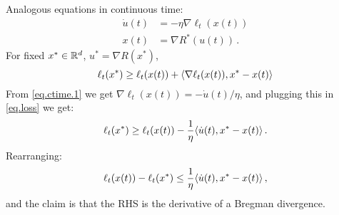 \documentclass[12pt]{report}
\theoremstyle{plain}
\theoremstyle{definition}
\theoremstyle{remark}
\begin{document}
Analogous equations in continuous time:
\begin{align*}
\dot{u}(t) &= - \eta \nabla \ell_{t}(x(t)) \label{eq.ctime.1} \tag{1ct} \\
x(t) &= \nabla R^{*}(u(t))\,. \label{eq.ctime.2} \tag{2ct}
\end{align*}
For fixed $x^{*} \in \mathbb{R}^d$, $u^{*} = \nabla R(x^{*})$,
\setcounter{equation}{2}
\begin{equation}
\ell_{t}(x^{*}) \geq \ell_{t}(x(t)) + \langle {\nabla\ell_t(x(t)), x^{*} - x(t)}\rangle \label{eq.loss}
\end{equation}
From \eqref{eq.ctime.1} we get $\nabla \ell_{t}(x(t)) = -\dot{u}(t)/\eta$, 
and plugging this in \eqref{eq.loss} we get:
$$
\ell_{t}(x^{*}) \geq \ell_{t}(x(t)) - \frac{1}{\eta} \langle {\dot{u}(t), x^{*} - x(t)}\rangle\,.
$$
Rearranging:
\begin{equation}
\ell_{t}(x(t)) - \ell_{t}(x^{*}) \leq  \frac{1}{\eta} \langle {\dot{u}(t), x^{*} - x(t)}\rangle\,, \label{eq.loss.prep}
\end{equation}
and the claim is that the RHS is the derivative of a Bregman divergence.

\bigskip
\end{document}
